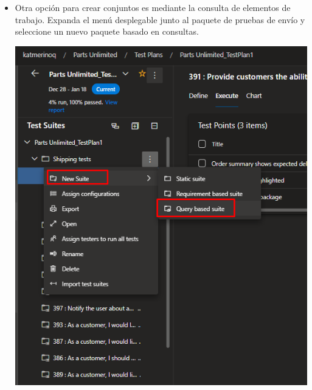 \begin{itemize}
\item Otra opción para crear conjuntos es mediante la consulta de elementos de trabajo. Expanda el menú desplegable junto al paquete de pruebas de envío y seleccione un nuevo paquete basado en consultas.
\begin{center}
\includegraphics[width=\columnwidth]{images/37}\newline
\end{center}


\end{itemize}
